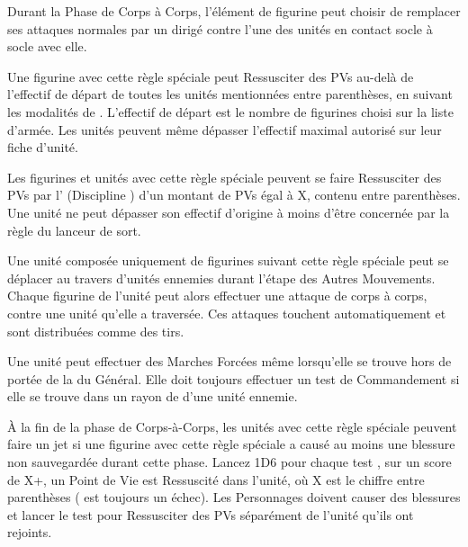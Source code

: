 {Durant la Phase de Corps à Corps, l'élément de figurine peut choisir de remplacer ses attaques normales par un \chillingshriek{} dirigé contre l'une des unités en contact socle à socle avec elle.


Une figurine avec cette règle spéciale peut Ressusciter des PVs au-delà de l'effectif de départ de toutes les unités mentionnées entre parenthèses, en suivant les modalités de \raisewounds{}. L'effectif de départ est le nombre de figurines choisi sur la liste d'armée. Les unités peuvent même dépasser l'effectif maximal autorisé sur leur fiche d'unité.


Les figurines et unités avec cette règle spéciale peuvent se faire Ressusciter des PVs par l'\necromancysignaturespell{} (Discipline \necromancy{}) d'un montant de PVs égal à X, contenu entre parenthèses. Une unité ne peut dépasser son effectif d'origine à moins d'être concernée par la règle \awaken{} du lanceur de sort.

\armyspecialruleentry{\reaper}

Une unité composée uniquement de figurines suivant cette règle spéciale peut se déplacer au travers d'unités ennemies durant l'étape des Autres Mouvements. Chaque figurine de l'unité peut alors effectuer une attaque de corps à corps, contre une unité qu'elle a traversée. Ces attaques touchent automatiquement et sont distribuées comme des tirs.


Une unité \vampiric{} peut effectuer des Marches Forcées même lorsqu'elle se trouve hors de portée de la \inspiringpresence{} du Général. Elle doit toujours effectuer un test de Commandement si elle se trouve dans un rayon de  d'une unité ennemie.

À la fin de la phase de Corps-à-Corps, les unités avec cette règle spéciale peuvent faire un jet \vampiric{} si une figurine avec cette règle spéciale a causé au moins une blessure non sauvegardée durant cette phase. Lancez 1D6 pour chaque test \vampiric{}, sur un score de X+, un Point de Vie est Ressuscité dans l'unité, où X est le chiffre entre parenthèses ( est toujours un échec). Les Personnages doivent causer des blessures et lancer le test pour Ressusciter des PVs séparément de l'unité qu'ils ont rejoints.

\armyspecialruleentry{\wakethedead}

}
